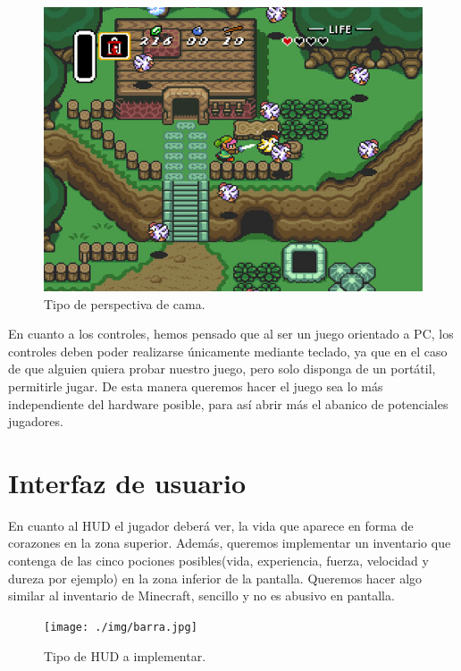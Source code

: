 \begin{figure}[!htb]
  \centering
    \includegraphics[width=\linewidth]{./img/camara.jpg}
    \caption{Tipo de perspectiva de cama.}
  \label{fig:yo}
\end{figure}
En cuanto a los controles, hemos pensado que al ser un juego orientado a PC, los controles deben poder realizarse únicamente mediante teclado, ya que en el caso de que alguien quiera probar nuestro juego, pero solo disponga de un portátil, permitirle jugar. De esta manera queremos hacer el juego sea lo más independiente del hardware posible, para así abrir más el abanico de potenciales jugadores.

\section{Interfaz de usuario}
En cuanto al HUD el jugador deberá ver, la vida que aparece en forma de corazones en la zona superior. Además, queremos implementar un inventario que contenga de las cinco pociones posibles(vida, experiencia, fuerza, velocidad y dureza por ejemplo) en la zona inferior de la pantalla. Queremos hacer algo similar al inventario de Minecraft, sencillo y no es abusivo en pantalla.

\begin{figure}[!htb]
  \centering
    \texttt{[image: ./img/barra.jpg]}
    \caption{Tipo de HUD a implementar.}
  \label{fig:yo}
\end{figure}
\newpage
